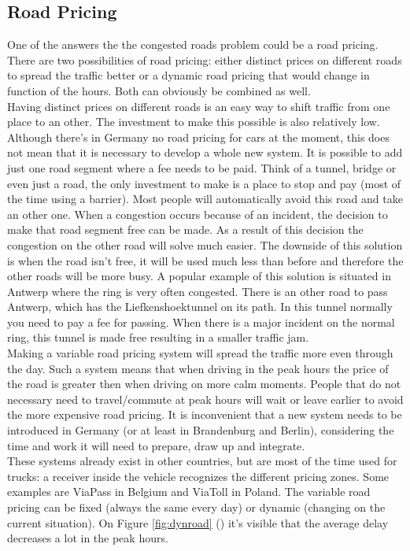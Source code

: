 \subsection{Road Pricing} \label{subsec:RoadTax}
One of the answers the the congested roads problem could be a road pricing. There are two possibilities of road pricing: either distinct prices on different roads to spread the traffic better or a dynamic road pricing that would change in function of the hours. Both can obviously be combined as well. \\ \newline
Having distinct prices on different roads is an easy way to shift traffic from one place to an other. The investment to make this possible is also relatively low. Although there's in Germany no road pricing for cars at the moment, this does not mean that it is necessary to develop a whole new system. It is possible to add just one road segment where a fee needs to be paid. Think of a tunnel, bridge or even just a road, the only investment to make is a place to stop and pay (most of the time using a barrier). Most people will automatically avoid this road and take an other one. When a congestion occurs because of an incident, the decision to make that road segment free can be made. As a result of this decision the congestion on the other road will solve much easier. The downside of this solution is when the road isn't free, it will be used much less than before and therefore the other roads will be more busy. A popular example of this solution is situated in Antwerp where the ring is very often congested. There is an other road to pass Antwerp, which has the Liefkenshoektunnel on its path. In this tunnel normally you need to pay a fee for passing. When there is a major incident on the normal ring, this tunnel is made free resulting in a smaller traffic jam.     \\ \newline
Making a variable road pricing system will spread the traffic more even through the day. Such a system means that when driving in the peak hours the price of the road is greater then when driving on more calm moments. People that do not necessary need to travel/commute at peak hours will wait or leave earlier to avoid the more expensive road pricing. It is inconvenient that a new system needs to be introduced in Germany (or at least in Brandenburg and Berlin), considering the time and work it will need to prepare, draw up and integrate. \\ \newline
These systems already exist in other countries, but are most of the time used for trucks: a receiver inside the vehicle recognizes the different pricing zones. Some examples are ViaPass in Belgium and ViaToll in Poland. The variable road pricing can be fixed (always the same every day) or dynamic (changing on the current situation). On Figure \ref{fig:dynroad} (\cite{dynRoadPrice}) it's visible that the average delay decreases a lot in the peak hours.

